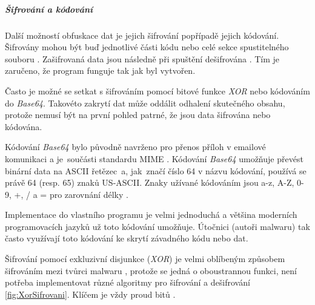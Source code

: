 \subparagraph*{Šifrování a kódování}

Další možností obfuskace dat je jejich šifrování popřípadě jejich kódování. Šifrovány mohou být buď jednotlivé části kódu nebo celé sekce spustitelného souboru \cite{sevagas_2014}. Zašifrovaná data jsou následně při spuštění dešifrována \cite{guardsquare_2019}. Tím je zaručeno, že program funguje tak jak byl vytvořen.

Často je možné se setkat s šifrováním pomocí bitové funkce \emph{XOR} nebo kódováním do \emph{Base64}. Takovéto zakrytí dat může oddálit odhalení skutečného obsahu, protože nemusí být na první pohled patrné, že jsou data šifrována nebo kódována.



        
        
Kódování \emph{Base64} bylo původně navrženo pro přenos příloh v emailové komunikaci a je~součásti standardu MIME \cite{sikorski2012practical}. Kódování \emph{Base64} umožňuje převést binární data na ASCII řetězec~a, jak~značí číslo 64 v názvu kódování, používá se právě 64 (resp. 65) znaků US-ASCII. Znaky užívané kódováním jsou a-z, A-Z, 0-9, +, / a = pro zarovnání délky \cite{RFC4648}.

Implementace do vlastního programu je velmi jednoduchá a většina moderních programovacích jazyků už toto kódování umožňuje. Útočnici (autoři malwaru) tak často využívají toto kódování ke skrytí závadného kódu nebo dat. 


% 

Šifrování pomocí exkluzivní disjunkce (\emph{XOR}) je velmi oblíbeným způsobem šifrováním mezi tvůrci malwaru \cite{sikorski2012practical}, protože se jedná o oboustrannou funkci, není potřeba implementovat různé algoritmy pro šifrování a dešifrování \ref{fig:XorSifrovani}. Klíčem je vždy proud bitů \cite{kpb_ochodkova2019}.

